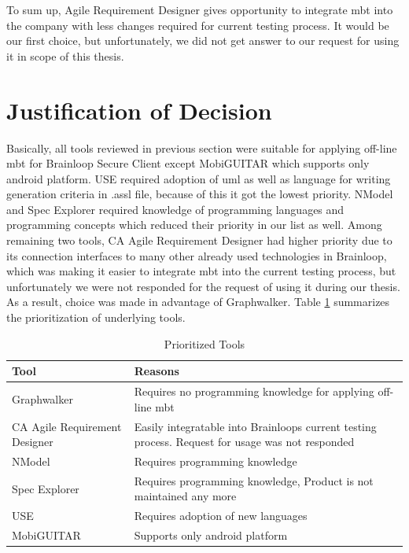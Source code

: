 \par
To sum up, Agile Requirement Designer gives opportunity to integrate \acrshort{mbt} into the company with less changes required for current testing process. It would be our first choice, but unfortunately, we did not get answer to our request for using it in scope of this thesis.

\section{Justification of Decision}

\par
Basically, all tools reviewed in previous section were suitable for applying off-line \acrshort{mbt} for Brainloop Secure Client except MobiGUITAR which supports only android platform. USE required adoption of \acrshort{uml} as well as language for writing generation criteria in .assl file, because of this it got the lowest priority. NModel and Spec Explorer required knowledge of programming languages and programming concepts which reduced their priority in our list as well. Among remaining two tools, CA Agile Requirement Designer had higher priority due to its connection interfaces to many other already used technologies in Brainloop, which was making it easier to integrate \acrshort{mbt} into the current testing process, but unfortunately we were not responded for the request of using it during our thesis. As a result, choice was made in advantage of Graphwalker. Table \ref{tab:Prioritized_Tools} summarizes the prioritization of underlying tools.

\begin{table}[]
    \centering
    \begin{tabular}{|l|p{10cm}|}
        \hline
        Tool & Reasons \\
        \hline
        Graphwalker & Requires no programming knowledge for applying off-line \acrshort{mbt} \\
        \hline
        CA Agile Requirement Designer & Easily integratable into Brainloops current testing process. Request for usage was not responded \\
        \hline
        NModel & Requires programming knowledge \\
        \hline
        Spec Explorer & Requires programming knowledge, Product is not maintained any more \\
        \hline
        USE & Requires adoption of new languages \\
        \hline
        MobiGUITAR & Supports only android platform \\
        \hline
    \end{tabular}
    \caption{Prioritized Tools}
    \label{tab:Prioritized_Tools}
\end{table}